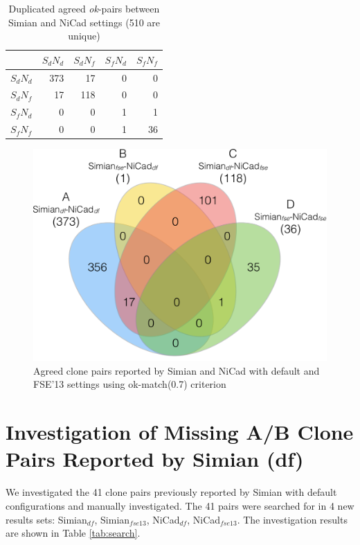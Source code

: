 \documentclass{IEEEtran}
\begin{document}
\begin{table}[h]
	\centering
	\caption{Duplicated agreed \textit{ok}-pairs between Simian and NiCad settings  (510 are unique)}
	\label{t_dup_agreed_ok_clone_pairs}
	\begin{tabular}{l|r|r|r|r}
		\hline
		& $S_dN_d$ & $S_dN_f$ & $S_fN_d$ & $S_fN_f$ \\ %
		\hline
		$S_dN_d$ & 373 & 17 & 0 & 0 \\%
		$S_dN_f$ & 17 & 118 & 0 & 0 \\ %
		$S_fN_d$ & 0 & 0 & 1 & 1 \\
		$S_fN_f$ & 0 & 0 & 1 & 36 \\	
		\hline
	\end{tabular}
\end{table}

\begin{figure}[H]
	\centering
	\includegraphics[width=0.5\linewidth]{venn4_pairs_ok}
	\caption[Agreed clone pairs reported by Simian and NiCad with default and FSE'13 settings using ok-match(0.7) criterion]{Agreed clone pairs reported by Simian and NiCad with default and FSE'13 settings using ok-match(0.7) criterion}
	\label{fig:venn4_pairs}
\end{figure}

\section*{Investigation of Missing A/B Clone Pairs Reported by Simian (df)}
We investigated the 41 clone pairs previously reported by Simian with default configurations and manually investigated. The 41 pairs were searched for in 4 new results sets: Simian$_{df}$, Simian$_{fse13}$, NiCad$_{df}$, NiCad$_{fse13}$. The investigation results are shown in Table \ref{tab:search}.
\end{document}
